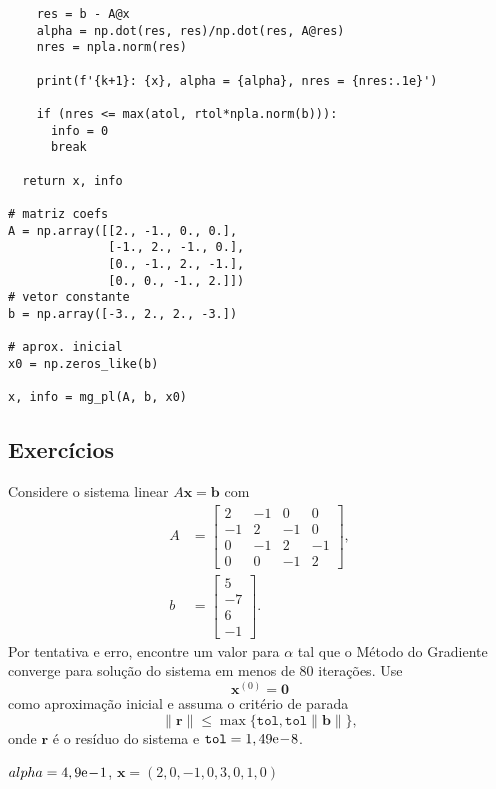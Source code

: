 \begin{ex}
\begin{lstlisting}
    res = b - A@x
    alpha = np.dot(res, res)/np.dot(res, A@res)
    nres = npla.norm(res)

    print(f'{k+1}: {x}, alpha = {alpha}, nres = {nres:.1e}')

    if (nres <= max(atol, rtol*npla.norm(b))):
      info = 0
      break

  return x, info
            
# matriz coefs
A = np.array([[2., -1., 0., 0.],
              [-1., 2., -1., 0.],
              [0., -1., 2., -1.],
              [0., 0., -1., 2.]])
# vetor constante
b = np.array([-3., 2., 2., -3.])

# aprox. inicial
x0 = np.zeros_like(b)

x, info = mg_pl(A, b, x0)
\end{lstlisting}

\end{ex}

\subsection{Exercícios}

\begin{exer}\label{cap_sislin_sec_metg:exer:mg0}
  Considere o sistema linear $A\pmb{x} = \pmb{b}$ com
  \begin{align}
    A &=
    \begin{bmatrix}
      2 & -1 & 0 & 0\\
      -1 & 2 & -1 & 0\\
      0 & -1 & 2 & -1 \\
      0 & 0 & -1 & 2
    \end{bmatrix},\\
    b &=
    \begin{bmatrix}
      5\\
      -7\\
      6\\
      -1
    \end{bmatrix}.
  \end{align}
  Por tentativa e erro, encontre um valor para $\alpha$ tal que o Método do Gradiente converge para solução do sistema em menos de $80$ iterações. Use
  \begin{equation}
    \pmb{x}^{(0)} = \pmb{0}
  \end{equation}
  como aproximação inicial e assuma o critério de parada
  \begin{equation}
    \|\pmb{r}\| \leq \max\{\texttt{tol}, \texttt{tol}\|\pmb{b}\|\},
  \end{equation}
  onde $\pmb{r}$ é o resíduo do sistema e $\texttt{tol} = 1,49\mathrm{e}\!-\!8$.
\end{exer}
\begin{resp}
  $alpha = 4,9\mathrm{e}\!-\!1$, $\pmb{x} = \left(2,0, -1,0, 3,0, 1,0\right)$
\end{resp}

